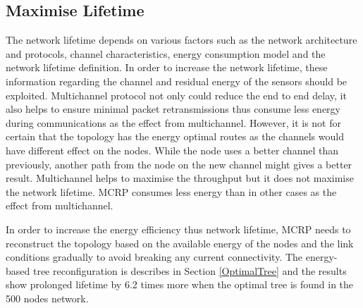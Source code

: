 \subsection{Maximise Lifetime}
The network lifetime depends on various factors such as the network architecture and protocols, channel characteristics, energy consumption model and the network lifetime definition. In order to increase the network lifetime, these information regarding the channel and residual energy of the sensors should be exploited.
Multichannel protocol not only could reduce the end to end delay, it also helps to ensure minimal packet retransmissions thus consume less energy during communications as the effect from multichannel. However, it is not for certain that the topology has the energy optimal routes as the channels would have different effect on the nodes. While the node uses a better channel than previously, another path from the node on the new channel might gives a better result. 
Multichannel helps to maximise the throughput but it does not maximise the network lifetime.
MCRP consumes less energy than in other cases as the effect from multichannel. 

In order to increase the energy efficiency thus network lifetime, MCRP needs to reconstruct the topology based on the available energy of the nodes and the link conditions gradually to avoid breaking any current connectivity. The energy-based tree reconfiguration is describes in Section \ref{OptimalTree} and the results show prolonged lifetime by 6.2 times more when the optimal tree is found in the 500 nodes network.